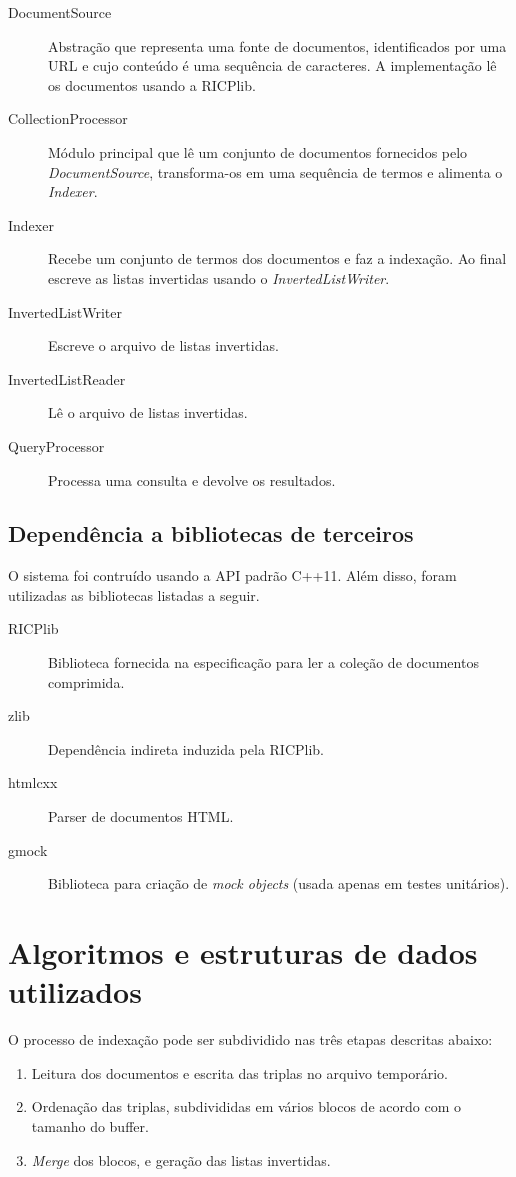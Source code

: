 \documentclass[12pt]{article}
\begin{document}
\begin{description}
\item[DocumentSource] Abstração que representa uma fonte de documentos, identificados por uma URL e cujo conteúdo é uma sequência de caracteres. A implementação lê os documentos usando a RICPlib.
\item[CollectionProcessor] Módulo principal que lê um conjunto de documentos fornecidos pelo \emph{DocumentSource}, transforma-os em uma sequência de termos e alimenta o \emph{Indexer}.
\item[Indexer] Recebe um conjunto de termos dos documentos e faz a indexação. Ao final escreve as listas invertidas usando o \emph{InvertedListWriter}.
\item[InvertedListWriter] Escreve o arquivo de listas invertidas.
\item[InvertedListReader] Lê o arquivo de listas invertidas.
\item[QueryProcessor] Processa uma consulta e devolve os resultados.
\end{description}


\subsection{Dependência a bibliotecas de terceiros}

O sistema foi contruído usando a API padrão C++11. Além disso, foram utilizadas as bibliotecas listadas a seguir.

\begin{description}
\item[RICPlib] Biblioteca fornecida na especificação para ler a coleção de documentos comprimida.
\item[zlib] Dependência indireta induzida pela RICPlib.
\item[htmlcxx] Parser de documentos HTML.
\item[gmock] Biblioteca para criação de \textit{mock objects} (usada apenas em testes unitários).
\end{description}


\section{Algoritmos e estruturas de dados utilizados}

O processo de indexação pode ser subdividido nas três etapas descritas abaixo:
\begin{enumerate}
\item Leitura dos documentos e escrita das triplas no arquivo temporário.
\item Ordenação das triplas, subdivididas em vários blocos de acordo com o tamanho do buffer.
\item \emph{Merge} dos blocos, e geração das listas invertidas.
\end{enumerate}
\end{document}
